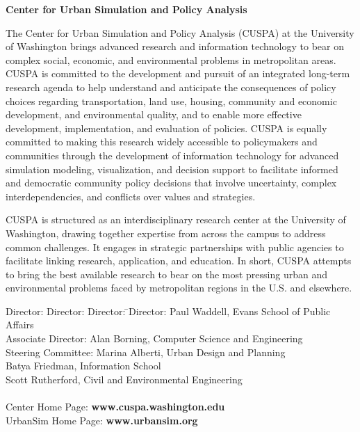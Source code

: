 
{\bf \large Center for Urban Simulation and Policy Analysis}

The Center for Urban Simulation and Policy Analysis (CUSPA) at the
University of Washington brings advanced research and information
technology to bear on complex social, economic, and environmental
problems in metropolitan areas.  CUSPA is committed to the
development and pursuit of an integrated long-term research agenda
to help understand and anticipate the consequences of policy
choices regarding transportation, land use, housing, community and
economic development, and environmental quality, and to enable
more effective development, implementation, and evaluation of
policies.  CUSPA is equally committed to making this research
widely accessible to policymakers and communities through the
development of information technology for advanced simulation
modeling, visualization, and decision support to facilitate
informed and democratic community policy decisions that involve
uncertainty, complex interdependencies, and conflicts over values
and strategies.

CUSPA is structured as an interdisciplinary research center at the
University of Washington, drawing together expertise from across
the campus to address common challenges.  It engages in strategic
partnerships with public agencies to facilitate linking research,
application, and education.  In short, CUSPA attempts to bring the
best available research to bear on the most pressing urban and
environmental problems faced by metropolitan regions in the U.S.
and elsewhere.

\begin{tabbing}
Director: Director: Director: \= \kill Director:\> Paul Waddell,
Evans School of Public Affairs \\
Associate Director:\> Alan Borning, Computer Science and Engineering \\
Steering Committee:\> Marina Alberti, Urban Design and Planning \\
               \> Batya Friedman, Information School \\
\>Scott Rutherford, Civil and Environmental Engineering \\\\
Center Home Page: \> {\bf www.cuspa.washington.edu} \\
UrbanSim Home Page: \> {\bf www.urbansim.org}
\end{tabbing}
